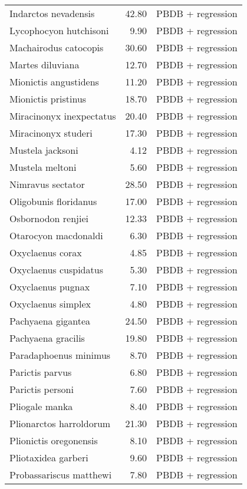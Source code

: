 \begin{table}[ht]
\begin{tabular}{lrl}
  Indarctos nevadensis & 42.80 & PBDB + regression \\ 
  Lycophocyon hutchisoni & 9.90 & PBDB + regression \\ 
  Machairodus catocopis & 30.60 & PBDB + regression \\ 
  Martes diluviana & 12.70 & PBDB + regression \\ 
  Mionictis angustidens & 11.20 & PBDB + regression \\ 
  Mionictis pristinus & 18.70 & PBDB + regression \\ 
  Miracinonyx inexpectatus & 20.40 & PBDB + regression \\ 
  Miracinonyx studeri & 17.30 & PBDB + regression \\ 
  Mustela jacksoni & 4.12 & PBDB + regression \\ 
  Mustela meltoni & 5.60 & PBDB + regression \\ 
  Nimravus sectator & 28.50 & PBDB + regression \\ 
  Oligobunis floridanus & 17.00 & PBDB + regression \\ 
  Osbornodon renjiei & 12.33 & PBDB + regression \\ 
  Otarocyon macdonaldi & 6.30 & PBDB + regression \\ 
  Oxyclaenus corax & 4.85 & PBDB + regression \\ 
  Oxyclaenus cuspidatus & 5.30 & PBDB + regression \\ 
  Oxyclaenus pugnax & 7.10 & PBDB + regression \\ 
  Oxyclaenus simplex & 4.80 & PBDB + regression \\ 
  Pachyaena gigantea & 24.50 & PBDB + regression \\ 
  Pachyaena gracilis & 19.80 & PBDB + regression \\ 
  Paradaphoenus minimus & 8.70 & PBDB + regression \\ 
  Parictis parvus & 6.80 & PBDB + regression \\ 
  Parictis personi & 7.60 & PBDB + regression \\ 
  Pliogale manka & 8.40 & PBDB + regression \\ 
  Plionarctos harroldorum & 21.30 & PBDB + regression \\ 
  Plionictis oregonensis & 8.10 & PBDB + regression \\ 
  Pliotaxidea garberi & 9.60 & PBDB + regression \\ 
  Probassariscus matthewi & 7.80 & PBDB + regression \\ 

\end{tabular}
\end{table}
